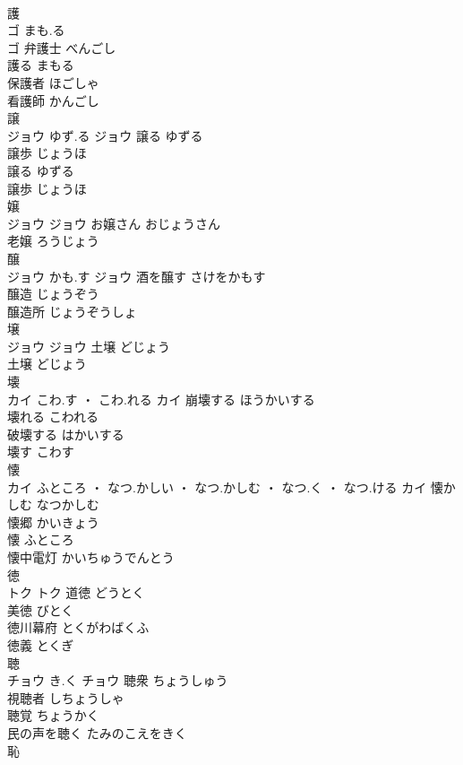 \documentclass[8pt]{extreport}
\begin{document}
\begin{CJK}{UTF8}{min}
\\	護	
\\	ゴ	まも.る
\\	ゴ	弁護士	べんごし	
\\	護る	まもる	
\\	保護者	ほごしゃ	
\\	看護師	かんごし	
\\	譲	
\\	ジョウ	ゆず.る	ジョウ	譲る	ゆずる	
\\	譲歩	じょうほ	
\\	譲る	ゆずる	
\\	譲歩	じょうほ	
\\	嬢	
\\	ジョウ		ジョウ	お嬢さん	おじょうさん	
\\	老嬢	ろうじょう	
\\	醸	
\\	ジョウ	かも.す	ジョウ	酒を醸す	さけをかもす	
\\	醸造	じょうぞう	
\\	醸造所	じょうぞうしょ	
\\	壌	
\\	ジョウ		ジョウ	土壌	どじょう	
\\	土壌	どじょう	
\\	壊	
\\	カイ	こわ.す ・ こわ.れる	カイ	崩壊する	ほうかいする	
\\	壊れる	こわれる	
\\	破壊する	はかいする	
\\	壊す	こわす	
\\	懐	
\\	カイ	ふところ ・ なつ.かしい ・ なつ.かしむ ・ なつ.く ・ なつ.ける	カイ	懐かしむ	なつかしむ	
\\	懐郷	かいきょう	
\\	懐	ふところ	
\\	懐中電灯	かいちゅうでんとう	
\\	徳	
\\	トク		トク	道徳	どうとく	
\\	美徳	びとく	
\\	徳川幕府	とくがわばくふ	
\\	徳義	とくぎ	
\\	聴	
\\	チョウ	き.く	チョウ	聴衆	ちょうしゅう	
\\	視聴者	しちょうしゃ	
\\	聴覚	ちょうかく	
\\	民の声を聴く	たみのこえをきく	
\\	恥	

\end{CJK}
\end{document}
